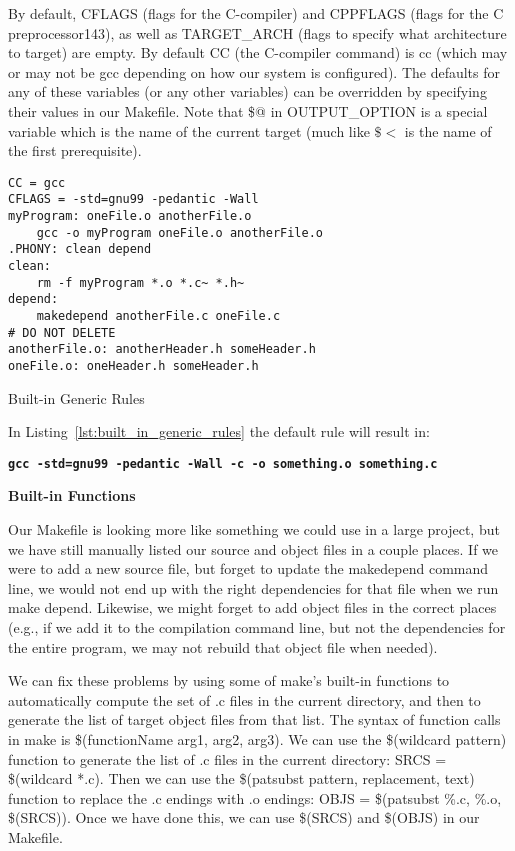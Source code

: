 \documentclass[11pt, a4paper]{article}
\begin{document}
By default, CFLAGS (flags for the C-compiler) and CPPFLAGS (flags for the C preprocessor143), as well as TARGET\_ARCH (flags to specify what architecture to target) are empty. By default CC (the C-compiler command) is cc (which may or may not be gcc depending on how our system is configured). The defaults for any of these variables (or any other variables) can be overridden by specifying their values in our Makefile. Note that \$@ in OUTPUT\_OPTION is a special variable which is the name of the current target (much like $\$<$ is the name of the first prerequisite).



\begin{listing}
\begin{verbatim}
CC = gcc
CFLAGS = -std=gnu99 -pedantic -Wall
myProgram: oneFile.o anotherFile.o
    gcc -o myProgram oneFile.o anotherFile.o
.PHONY: clean depend
clean:
    rm -f myProgram *.o *.c~ *.h~
depend:
    makedepend anotherFile.c oneFile.c
# DO NOT DELETE
anotherFile.o: anotherHeader.h someHeader.h
oneFile.o: oneHeader.h someHeader.h
\end{verbatim}
\caption{Built-in Generic Rules}
\label{lst:built_in_generic_rules}
\end{listing}




In Listing~\ref{lst:built_in_generic_rules} the default rule will result in:


\textbf{ \texttt{gcc -std=gnu99 -pedantic -Wall -c -o something.o something.c}  }

\textbf{Built-in Functions}



Our Makefile is looking more like something we could use in a large project, but we have still manually listed our source and object files in a couple places. If we were to add a new source file, but forget to update the makedepend command line, we would not end up with the right dependencies for that file when we run make depend. Likewise, we might forget to add object files in the correct places (e.g., if we add it to the compilation command line, but not the dependencies for the entire program, we may not rebuild that object file when needed).

We can fix these problems by using some of make’s built-in functions to automatically compute the set of .c files in the current directory, and then to generate the list of target object files from that list. The syntax of function calls in make is \$(functionName arg1, arg2, arg3). We can use the \$(wildcard pattern) function to generate the list of .c files in the current directory: SRCS = \$(wildcard *.c). Then we can use the \$(patsubst pattern, replacement, text) function to replace the .c endings with .o endings: OBJS = \$(patsubst \%.c, \%.o, \$(SRCS)). Once we have done this, we can use \$(SRCS) and \$(OBJS) in our Makefile.
\end{document}
